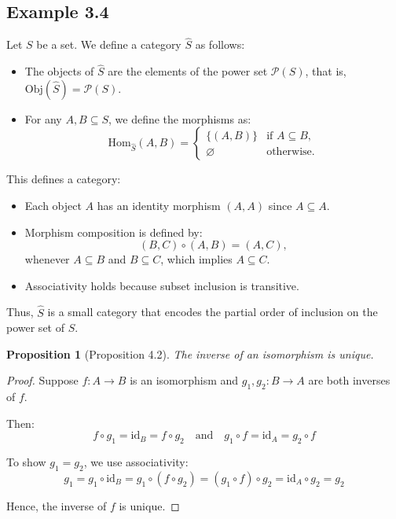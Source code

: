 \documentclass[10pt]{article}
\theoremstyle{plain}
\newtheorem{proposition}{Proposition}
\theoremstyle{definition}
\begin{document}
 \subsection*{Example 3.4}
 	Let $S$ be a set. We define a category $\widehat{S}$ as follows:
 	\begin{itemize}
 		\item The objects of $\widehat{S}$ are the elements of the power set $\mathcal{P}(S)$, that is, $\mathrm{Obj}(\widehat{S}) = \mathcal{P}(S)$.
 		\item For any $A, B \subseteq S$, we define the morphisms as:
 		\[
 		\mathrm{Hom}_{\widehat{S}}(A, B) =
 		\begin{cases}
 			\{(A, B)\} & \text{if } A \subseteq B, \\
 			\varnothing & \text{otherwise}.
 		\end{cases}
 		\]
 	\end{itemize}
 	
 	This defines a category:
 	\begin{itemize}
 		\item Each object $A$ has an identity morphism $(A, A)$ since $A \subseteq A$.
 		\item Morphism composition is defined by:
 		\[
 		(B, C) \circ (A, B) = (A, C),
 		\]
 		whenever $A \subseteq B$ and $B \subseteq C$, which implies $A \subseteq C$.
 		\item Associativity holds because subset inclusion is transitive.
 	\end{itemize}
 	
 	Thus, $\widehat{S}$ is a small category that encodes the partial order of inclusion on the power set of $S$.
  
  \begin{proposition}[Proposition 4.2]
  	The inverse of an isomorphism is unique.
  \end{proposition}
  
  \begin{proof}
  	Suppose $f : A \to B$ is an isomorphism and $g_1, g_2 : B \to A$ are both inverses of $f$.
  	
  	Then:
  	\[
  	f \circ g_1 = \mathrm{id}_B = f \circ g_2 \quad \text{and} \quad g_1 \circ f = \mathrm{id}_A = g_2 \circ f
  	\]
  	
  	To show $g_1 = g_2$, we use associativity:
  	\[
  	g_1 = g_1 \circ \mathrm{id}_B = g_1 \circ (f \circ g_2) = (g_1 \circ f) \circ g_2 = \mathrm{id}_A \circ g_2 = g_2
  	\]
  	
  	Hence, the inverse of $f$ is unique.
  \end{proof}
  
\end{document}

